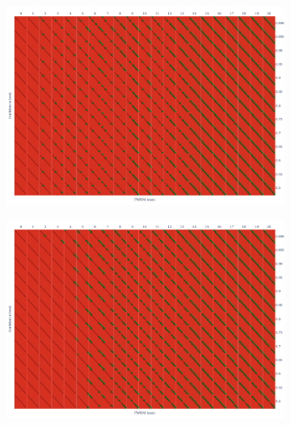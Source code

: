 \documentclass{article}
\begin{document}
\begin{figure}
    \centering
    \begin{subfigure}[t]{0.7\linewidth}
        \includegraphics[width=\linewidth]{figures/inter-subject/one_mct_fwe_bonferroni_RR.pdf}
    \end{subfigure}

    \begin{subfigure}[t]{0.7\linewidth}
        \includegraphics[width=\linewidth]{figures/inter-subject/one_mct_fwe_bonferroni_RS.pdf}
    \end{subfigure}


\end{figure}
\end{document}
